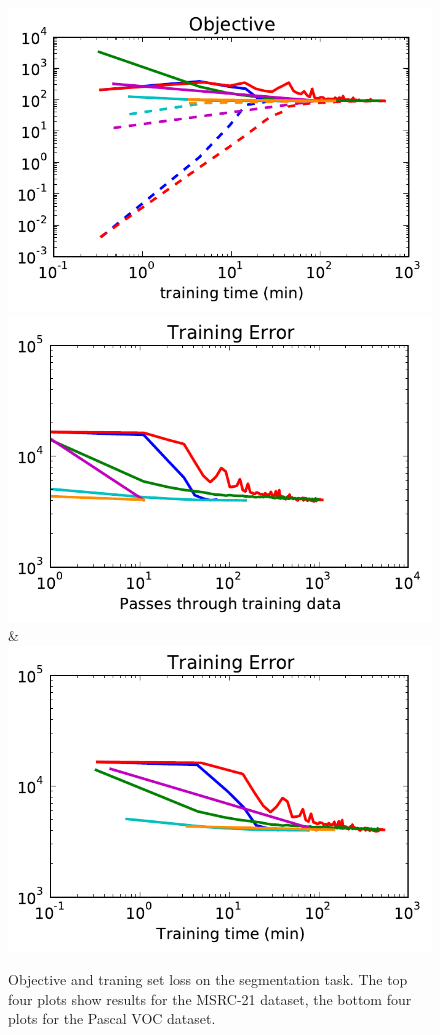 \begin{figure}
\begin{tabu}
    \includegraphics[width=\linewidth]{evaluation/images/pascal_time}\\
    \includegraphics[width=\linewidth]{evaluation/images/pascal_loss}&%
    \includegraphics[width=\linewidth]{evaluation/images/pascal_time_loss}
    \end{tabu}
\caption{%
    Objective and traning set loss on the segmentation task. The top four plots
    show results for the MSRC-21 dataset, the bottom four plots for the Pascal
    VOC dataset.
}
\end{figure}


